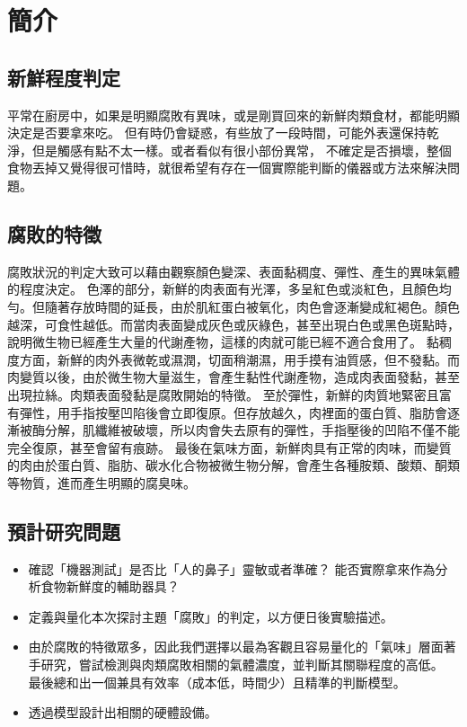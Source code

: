 \chapter{簡介}

\section{新鮮程度判定}
平常在廚房中，如果是明顯腐敗有異味，或是剛買回來的新鮮肉類食材，都能明顯決定是否要拿來吃。
但有時仍會疑惑，有些放了一段時間，可能外表還保持乾淨，但是觸感有點不太一樣。或者看似有很小部份異常，
不確定是否損壞，整個食物丟掉又覺得很可惜時，就很希望有存在一個實際能判斷的儀器或方法來解決問題。

\section{腐敗的特徵}
腐敗狀況的判定大致可以藉由觀察顏色變深、表面黏稠度、彈性、產生的異味氣體的程度決定。
色澤的部分，新鮮的肉表面有光澤，多呈紅色或淡紅色，且顏色均勻。但隨著存放時間的延長，由於肌紅蛋白被氧化，肉色會逐漸變成紅褐色。顏色越深，可食性越低。而當肉表面變成灰色或灰綠色，甚至出現白色或黑色斑點時，說明微生物已經產生大量的代謝產物，這樣的肉就可能已經不適合食用了。
黏稠度方面，新鮮的肉外表微乾或濕潤，切面稍潮濕，用手摸有油質感，但不發黏。而肉變質以後，由於微生物大量滋生，會產生黏性代謝產物，造成肉表面發黏，甚至出現拉絲。肉類表面發黏是腐敗開始的特徵。
至於彈性，新鮮的肉質地緊密且富有彈性，用手指按壓凹陷後會立即復原。但存放越久，肉裡面的蛋白質、脂肪會逐漸被酶分解，肌纖維被破壞，所以肉會失去原有的彈性，手指壓後的凹陷不僅不能完全復原，甚至會留有痕跡。
最後在氣味方面，新鮮肉具有正常的肉味，而變質的肉由於蛋白質、脂肪、碳水化合物被微生物分解，會產生各種胺類、酸類、酮類等物質，進而產生明顯的腐臭味。

\section{預計研究問題}
\begin{itemize}
	\item 確認「機器測試」是否比「人的鼻子」靈敏或者準確？
		能否實際拿來作為分析食物新鮮度的輔助器具？
	\item 定義與量化本次探討主題「腐敗」的判定，以方便日後實驗描述。
	\item 由於腐敗的特徵眾多，因此我們選擇以最為客觀且容易量化的「氣味」層面著手研究，嘗試檢測與肉類腐敗相關的氣體濃度，並判斷其關聯程度的高低。
		最後總和出一個兼具有效率（成本低，時間少）且精準的判斷模型。
	\item 透過模型設計出相關的硬體設備。
\end{itemize}